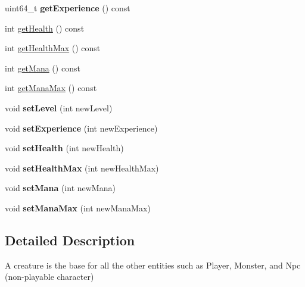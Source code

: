 \begin{DoxyCompactItemize}
\item 
\hypertarget{class_creature_a0a4c63548eb58906b0e1ba582c1c8768}{}uint64\+\_\+t {\bfseries get\+Experience} () const \label{class_creature_a0a4c63548eb58906b0e1ba582c1c8768}

\item 
int \hyperlink{class_creature_a574090a4e93defbe1755e873adb86d8d}{get\+Health} () const 
\item 
int \hyperlink{class_creature_a603d35d3a199f59e122b7923e90559ba}{get\+Health\+Max} () const 
\item 
int \hyperlink{class_creature_a4f0480d364b459391ba598c50811f126}{get\+Mana} () const 
\item 
int \hyperlink{class_creature_ad8f936e6e3b3ed2374fa4d414983b198}{get\+Mana\+Max} () const 
\item 
\hypertarget{class_creature_a3f5f07303c5c3b08a5c5260ea438c572}{}void {\bfseries set\+Level} (int new\+Level)\label{class_creature_a3f5f07303c5c3b08a5c5260ea438c572}

\item 
\hypertarget{class_creature_a009cdc946f7681e3ce350d803b1e2cf9}{}void {\bfseries set\+Experience} (int new\+Experience)\label{class_creature_a009cdc946f7681e3ce350d803b1e2cf9}

\item 
\hypertarget{class_creature_a3b77e79d4910b93cf1af2f460133f8d1}{}void {\bfseries set\+Health} (int new\+Health)\label{class_creature_a3b77e79d4910b93cf1af2f460133f8d1}

\item 
\hypertarget{class_creature_acfa73796bc907124049533610b2b23f3}{}void {\bfseries set\+Health\+Max} (int new\+Health\+Max)\label{class_creature_acfa73796bc907124049533610b2b23f3}

\item 
\hypertarget{class_creature_ae07d773ed76aff769c9b728c9d651772}{}void {\bfseries set\+Mana} (int new\+Mana)\label{class_creature_ae07d773ed76aff769c9b728c9d651772}

\item 
\hypertarget{class_creature_a6cade5d3822dc15f5d2c07c3ed6abac3}{}void {\bfseries set\+Mana\+Max} (int new\+Mana\+Max)\label{class_creature_a6cade5d3822dc15f5d2c07c3ed6abac3}

\end{DoxyCompactItemize}


\subsection{Detailed Description}
A creature is the base for all the other entities such as Player, Monster, and Npc (non-\/playable character) 

